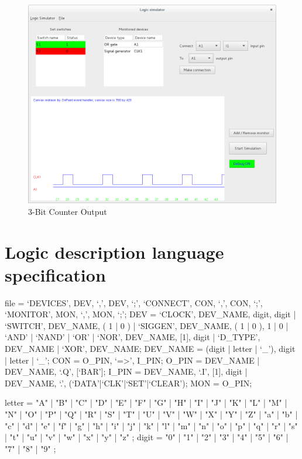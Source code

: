 \documentclass[12pt]{article}
\newenvironment{metaverbatim}{\verbatim}{\endverbatim}
\begin{document}
\begin{figure}[H]
	\centering
	\includegraphics[width=0.9\linewidth]{figures/test109.png}
	\captionsetup{width=.7\linewidth}
	\caption{3-Bit Counter Output}
	\label{fig:7}
\end{figure}




\newpage
\section{Logic description language specification}
\begin{metaverbatim}
file =  `DEVICES', DEV, {`,', DEV}, `;', `CONNECT', CON, {`,', CON}, `;',
        `MONITOR', MON, {`,', MON}, `;';
DEV  =  `CLOCK', DEV_NAME, digit, {digit} |
        `SWITCH', DEV_NAME, ( 1 | 0 ) |
        `SIGGEN', DEV_NAME, ( 1 | 0 ), { 1 | 0 } |
        `AND' | `NAND' | `OR' | `NOR', DEV_NAME, [1], digit	|
        `D_TYPE', DEV_NAME |
        `XOR', DEV_NAME;
DEV_NAME  =	 (digit | letter | `_'), {digit | letter | `_'};
CON       =  O_PIN, `=>', I_PIN;
O_PIN     =  DEV_NAME |
             DEV_NAME, `.Q', [`BAR'];
I_PIN     =  DEV_NAME, `.I', [1], digit	|
             DEV_NAME, `.', (`DATA'|`CLK'|`SET'|`CLEAR');
MON       =  O_PIN;

letter = "A" | "B" | "C" | "D" | "E" | "F" | "G"
       | "H" | "I" | "J" | "K" | "L" | "M" | "N"
       | "O" | "P" | "Q" | "R" | "S" | "T" | "U"
       | "V" | "W" | "X" | "Y" | "Z" | "a" | "b"
       | "c" | "d" | "e" | "f" | "g" | "h" | "i"
       | "j" | "k" | "l" | "m" | "n" | "o" | "p"
       | "q" | "r" | "s" | "t" | "u" | "v" | "w"
       | "x" | "y" | "z" ;
digit = "0" | "1" | "2" | "3" | "4" | "5" | "6" | "7" | "8" | "9" ;

\end{metaverbatim}
\end{document}

